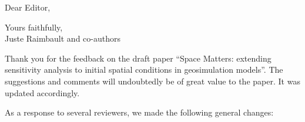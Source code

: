 \documentclass[11pt,a4paper,sans]{moderncv}        %
\begin{document}
\date{\today}
\opening{Dear Editor,}
\closing{Yours faithfully,\\
Juste Raimbault and co-authors%
}

\makelettertitle



\justify


Thank you for the feedback on the draft paper ``Space Matters: extending sensitivity analysis to initial spatial conditions in geosimulation models''. The suggestions and comments will undoubtedly be of great value to the paper. It was updated accordingly.

\medskip







As a response to several reviewers, we made the following general changes:
\end{document}

